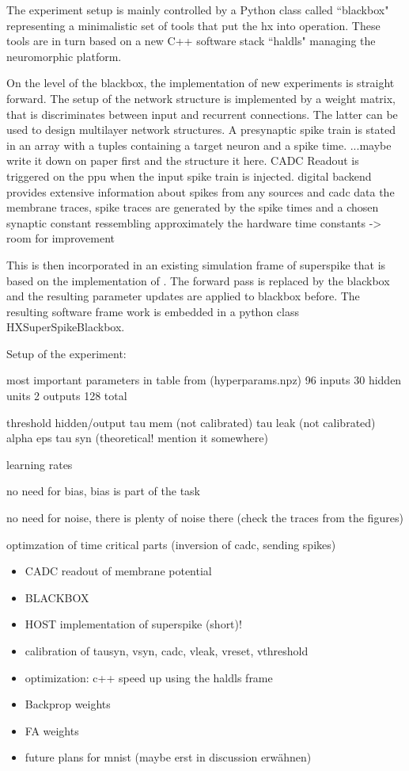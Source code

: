 The experiment setup is mainly controlled by a Python class called ``blackbox" representing a minimalistic set of tools that put the \gls{hx} into operation. These tools are in turn based on a new C++ software stack ``haldls" managing the neuromorphic platform. 

On the level of the blackbox, the implementation of new experiments is straight forward. The setup of the network structure is implemented by a weight matrix, that is discriminates between input and recurrent connections. The latter can be used to design multilayer network structures. A presynaptic spike train is stated in an array with a tuples containing a target neuron and a spike time. 
...maybe write it down on paper first and the structure it here.
CADC Readout is triggered on the ppu when the input spike train is injected.
digital backend provides extensive information about spikes from any sources and cadc data the membrane traces, spike traces are generated by the spike times and a chosen synaptic constant ressembling approximately the hardware time constants -> room for improvement

This is then incorporated in an existing simulation frame of superspike that is based on the implementation of \citealp{zenke2018superspike}. The forward pass is replaced by the blackbox and the resulting parameter updates are applied to blackbox before. The resulting software frame work is embedded in a python class HXSuperSpikeBlackbox. 

Setup of the experiment:

most important parameters in table from (hyperparams.npz)
96 inputs
30 hidden units
2 outputs
128 total
 
threshold hidden/output
tau mem (not calibrated)
tau leak (not calibrated)
alpha 
eps
tau syn (theoretical! mention it somewhere)

learning rates

no need for bias, bias is part of the task

no need for noise, there is plenty of noise there (check the traces from the figures)

optimzation of time critical parts (inversion of cadc, sending spikes)


\begin{itemize}
	\item CADC readout of membrane potential
	\item BLACKBOX
	\item HOST implementation of superspike (short)!
	\item calibration of tausyn, vsyn, cadc, vleak, vreset, vthreshold
	\item optimization: c++ speed up using the haldls frame
	\item Backprop weights
	\item FA weights
	\item future plans for mnist (maybe erst in discussion erwähnen)
\end{itemize}

